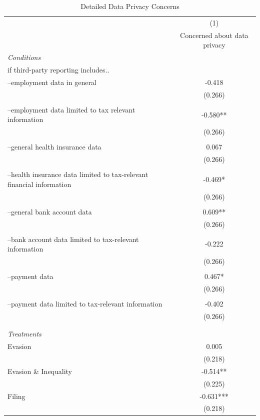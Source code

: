\documentclass[11pt]{article}
\begin{document}
\begin{table}[!htbp]\centering
\caption{Detailed Data Privacy Concerns}
\label{tab:detaileddataprivacy_noc}
\begin{threeparttable}
\footnotesize
\begin{tabular}{l|c}
\toprule
 & (1)\\
 & Concerned about data privacy \\
\midrule
\textit{Conditions} \\[0.25em]
if third-party reporting includes.. \\[0.25em]
--employment data in general & -0.418 \\
 & (0.266) \\\\[0.25em]
--employment data limited to tax relevant information & -0.580** \\
 & (0.266) \\\\[0.25em]
--general health insurance data & 0.067 \\
 & (0.266) \\\\[0.25em]
--health insurance data limited to tax-relevant financial information & -0.469* \\
 & (0.266) \\\\[0.25em]
--general bank account data & 0.609** \\
 & (0.266) \\\\[0.25em]
--bank account data limited to tax-relevant information & -0.222 \\
 & (0.266) \\\\[0.25em]
--payment data & 0.467* \\
 & (0.266) \\\\[0.25em]
--payment data limited to tax-relevant information & -0.402 \\
 & (0.266) \\\\[0.25em]
\\[1em]
\textit{Treatments} \\[0.25em]
Evasion & 0.005 \\
 & (0.218) \\
Evasion \& Inequality & -0.514** \\
 & (0.225) \\
Filing & -0.631*** \\
 & (0.218) \\

\end{tabular}
\end{threeparttable}
\end{table}
\end{document}
